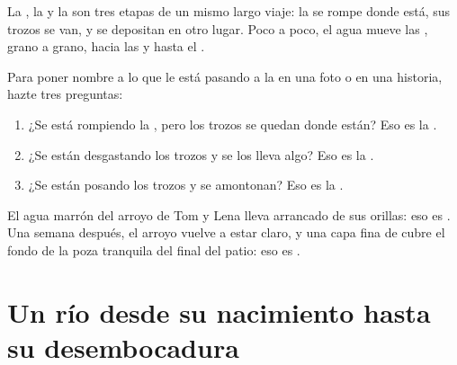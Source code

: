 La , la  y la  son tres etapas de un mismo
largo viaje: la  se rompe donde está, sus trozos se van, y se depositan
en otro lugar. Poco a poco, el agua mueve las , grano a grano,
hacia las  y hasta el .

\begin{method}\label{met:g5:water-shapes-the-land:naming}
Para poner nombre a lo que le está pasando a la  en una foto o en una
historia, hazte tres preguntas:
\begin{enumerate}
  \item ¿Se está rompiendo la , pero los trozos se quedan donde están?
        Eso es la \emph{}.
  \item ¿Se están desgastando los trozos y se los lleva algo? Eso es la
        \emph{}.
  \item ¿Se están posando los trozos y se amontonan? Eso es la
        \emph{}.
\end{enumerate}
\end{method}

\begin{example}\label{ex:g5:water-shapes-the-land:stream}
El agua marrón del arroyo de Tom y Lena lleva  arrancado de sus
orillas: eso es . Una semana después, el arroyo vuelve a estar
claro, y una capa fina de  cubre el fondo de la poza tranquila del
final del patio: eso es .
\end{example}

\section{Un río desde su nacimiento hasta su desembocadura}

